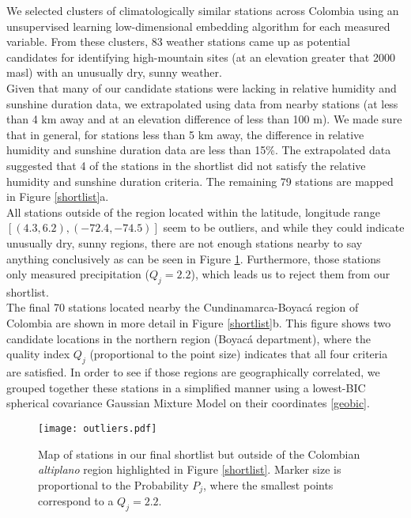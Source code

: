 \documentclass[12pt]{iopart}
\begin{document}
We selected clusters of climatologically similar stations across Colombia using an unsupervised learning low-dimensional embedding algorithm for each measured variable. From these clusters, 83 weather stations came up as potential candidates for identifying high-mountain sites (at an elevation greater that 2000 masl) with an unusually dry, sunny weather.\\

Given that many of our candidate stations were lacking in relative humidity and sunshine duration data, we extrapolated using data from nearby stations (at less than 4 km away and at an elevation difference of less than 100 m). We made sure that in general, for stations less than 5 km away, the difference in relative humidity and sunshine duration data are less than 15\%. The extrapolated data suggested that 4 of the stations in the shortlist did not satisfy the relative humidity and sunshine duration criteria.  The remaining 79 stations are mapped in Figure \ref{shortlist}a.\\

All stations outside of the region located within the latitude, longitude range $[(4.3,6.2),(-72.4,-74.5)]$ seem to be outliers, and while they could indicate unusually dry, sunny regions, there are not enough stations nearby to say anything conclusively as can be seen in Figure \ref{outliers}. Furthermore, those stations only measured precipitation ($Q_j=2.2$), which leads us to reject them from our shortlist. \\

The final 70 stations located nearby the Cundinamarca-Boyac\'a region of Colombia are shown in more detail in Figure \ref{shortlist}b. This figure shows two candidate locations in the northern region (Boyac\'a department), where the quality index $Q_j$ (proportional to the point size) indicates that all four criteria are satisfied. In order to see if those regions are geographically correlated, we grouped together these stations in a simplified manner using a lowest-BIC spherical covariance Gaussian Mixture Model on their coordinates \ref{geobic}.\\



\begin{figure}
\begin{center}
\texttt{[image: outliers.pdf]}
\caption{Map of stations in our final shortlist but outside of the Colombian \emph{altiplano} region highlighted in Figure \ref{shortlist}. Marker size is proportional to the Probability $P_j$, where the smallest points correspond to a $Q_j=2.2$.}\label{outliers}
\end{center}
\end{figure}
\end{document}
